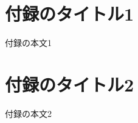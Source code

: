\documentclass[exploratorypaper]{jsaiart} %
\begin{document}



\appendix

\section{付録のタイトル1}

付録の本文1

\section{付録のタイトル2}

付録の本文2

\begin{biography}
\end{biography}
\end{document}
